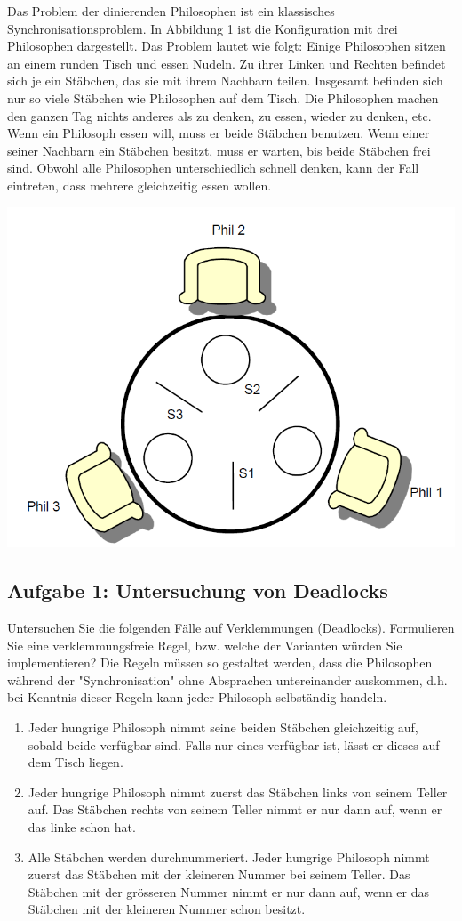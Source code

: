 Das Problem der dinierenden Philosophen ist ein klassisches Synchronisationsproblem. In Abbildung 1 ist
die Konfiguration mit drei Philosophen dargestellt. Das Problem lautet wie folgt:
Einige Philosophen sitzen an einem runden Tisch und essen Nudeln. Zu ihrer Linken und Rechten befindet
sich je ein Stäbchen, das sie mit ihrem Nachbarn teilen. Insgesamt befinden sich nur so viele Stäbchen wie
Philosophen auf dem Tisch.
Die Philosophen machen den ganzen Tag nichts anderes als zu denken, zu essen, wieder zu denken, etc.
Wenn ein Philosoph essen will, muss er beide Stäbchen benutzen. Wenn einer seiner Nachbarn ein Stäbchen
besitzt, muss er warten, bis beide Stäbchen frei sind. Obwohl alle Philosophen unterschiedlich schnell
denken, kann der Fall eintreten, dass mehrere gleichzeitig essen wollen.

\includegraphics[width=.4\linewidth]{900-Praktika/prak05/pic.PNG}


\subsection{Aufgabe 1: Untersuchung von Deadlocks}
Untersuchen Sie die folgenden Fälle auf Verklemmungen (Deadlocks). Formulieren Sie eine verklemmungsfreie
Regel, bzw. welche der Varianten würden Sie implementieren? Die Regeln müssen so gestaltet werden,
dass die Philosophen während der "Synchronisation" ohne Absprachen untereinander auskommen, d.h.
bei Kenntnis dieser Regeln kann jeder Philosoph selbständig handeln.

\begin{enumerate}
  \item Jeder hungrige Philosoph nimmt seine beiden Stäbchen gleichzeitig auf, sobald beide verfügbar sind.
Falls nur eines verfügbar ist, lässt er dieses auf dem Tisch liegen.
\item Jeder hungrige Philosoph nimmt zuerst das Stäbchen links von seinem Teller auf. Das Stäbchen rechts
von seinem Teller nimmt er nur dann auf, wenn er das linke schon hat.
\item Alle Stäbchen werden durchnummeriert. Jeder hungrige Philosoph nimmt zuerst das Stäbchen mit der
kleineren Nummer bei seinem Teller. Das Stäbchen mit der grösseren Nummer nimmt er nur dann auf,
wenn er das Stäbchen mit der kleineren Nummer schon besitzt.
\end{enumerate}

